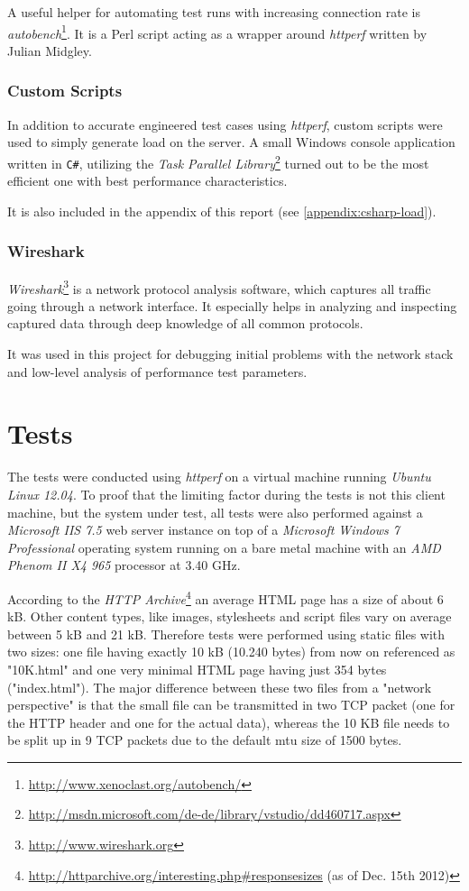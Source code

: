 A useful helper for automating test runs with increasing connection rate is \textit{autobench}\footnote{\url{http://www.xenoclast.org/autobench/}}. It is a Perl script acting as a wrapper around \textit{httperf} written by Julian Midgley.

\subsubsection{Custom Scripts}

In addition to accurate engineered test cases using \textit{httperf}, custom scripts were used to simply generate load on the server. A small Windows console application written in \texttt{C\#}, utilizing the \textit{Task Parallel Library}\footnote{\url{http://msdn.microsoft.com/de-de/library/vstudio/dd460717.aspx}} turned out to be the most efficient one with best performance characteristics.

It is also included in the appendix of this report (see \ref{appendix:csharp-load}).

\subsubsection{Wireshark}

\textit{Wireshark}\footnote{\url{http://www.wireshark.org}} is a network protocol analysis software, which captures all traffic going through a network interface. It especially helps in analyzing and inspecting captured data through deep knowledge of all common protocols.

It was used in this project for debugging initial problems with the network stack and low-level analysis of performance  test parameters.


\section{Tests}

The tests were conducted using \textit{httperf} on a virtual machine running \textit{Ubuntu Linux 12.04}. To proof that the limiting factor during the tests is not this client machine, but the system under test, all tests were also performed against a \textit{Microsoft IIS 7.5} web server instance on top of a \textit{Microsoft Windows 7 Professional} operating system running on a bare metal machine with an \textit{AMD Phenom II X4 965} processor at 3.40 GHz.

According to the \textit{HTTP Archive}\footnote{\url{http://httparchive.org/interesting.php\#responsesizes} (as of Dec. 15th 2012)} an average HTML page has a size of about 6 kB. Other content types, like images, stylesheets and script files vary on average between 5 kB and 21 kB. Therefore tests were performed using static files with two sizes: one file having exactly 10 kB (10.240 bytes) from now on referenced as "10K.html" and one very minimal HTML page having just 354 bytes ("index.html"). The major difference between these two files from a "network perspective" is that the small file can be transmitted in two TCP packet (one for the HTTP header and one for the actual data), whereas the 10 KB file needs to be split up in 9 TCP packets due to the default \gls{mtu} size of 1500 bytes.


